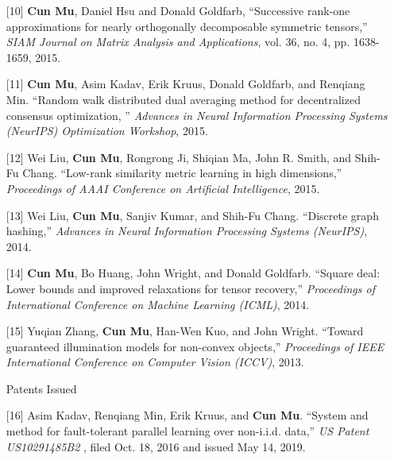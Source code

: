 \documentclass[11pt,a4paper,roman]{moderncv} %
\begin{document}
\begin{enumerate}
\vspace*{2mm}
\item[{[10]}] {\bfseries Cun Mu}, Daniel Hsu and Donald Goldfarb, ``Successive rank-one approximations for nearly orthogonally decomposable symmetric tensors,'' {\em SIAM Journal on Matrix Analysis and Applications}, vol. 36, no. 4, pp. 1638-1659, 2015.
\vspace*{2mm}
\item[{[11]}] {\bfseries Cun Mu}, Asim Kadav, Erik Kruus, Donald Goldfarb, and Renqiang Min. ``Random walk distributed dual averaging method for decentralized consensus optimization, '' {\em Advances in Neural Information Processing Systems (NeurIPS) Optimization Workshop}, 2015.
\vspace*{2mm}
\item[{[12]}] Wei Liu, {\bfseries Cun Mu}, Rongrong Ji, Shiqian Ma, John R. Smith, and Shih-Fu Chang.  ``Low-rank similarity metric learning in high dimensions,'' {\em Proceedings of AAAI Conference on Artificial Intelligence}, 2015. 
\vspace*{2mm}
\item[{[13]}] Wei Liu, {\bfseries Cun Mu}, Sanjiv Kumar, and Shih-Fu Chang. ``Discrete graph hashing,'' {\em Advances in Neural Information Processing Systems (NeurIPS)}, 2014.
\vspace*{2mm}
 \item[{[14]}] {\bfseries Cun Mu}, Bo Huang, John Wright, and Donald Goldfarb.  ``Square deal: Lower bounds and improved relaxations for tensor recovery,'' {\em Proceedings of International Conference on Machine Learning (ICML)}, 2014.
 \vspace*{2mm}
\item[{[15]}] {Yuqian Zhang}, {\bfseries Cun Mu}, Han-Wen Kuo, and John Wright. ``Toward guaranteed illumination models for non-convex objects,'' {\em Proceedings of IEEE International Conference on Computer Vision (ICCV)}, 2013.

\vspace*{3mm}
{\color{color1} Patents Issued}
\vspace*{1mm}
\item[{[16]}] Asim Kadav, Renqiang Min, Erik Kruus, and {\bfseries Cun Mu}. ``System and method for fault-tolerant parallel learning over non-i.i.d.  data,'' {\em US Patent US10291485B2
}, filed Oct. 18, 2016 and issued May 14, 2019.
\end{enumerate}
\end{document}
